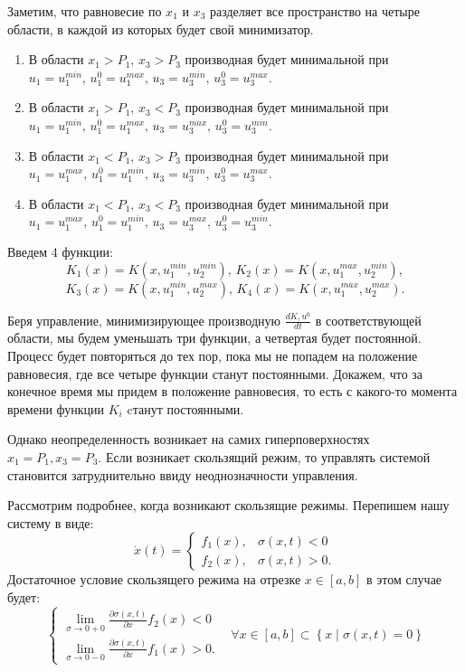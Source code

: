 \documentclass[11pt]{article}
\newcommand\Set[2]{\left\{ #1 \mid #2 \right\}}
\newcommand\dd[2]{\frac{\partial#1}{\partial#2}}
\begin{document}
Заметим, что равновесие по $x_1$ и $x_3$ разделяет все пространство на четыре области, в каждой из которых будет свой минимизатор.
\begin{enumerate}
\item
	В области $x_1 > P_1, \, x_3 > P_3$ производная будет минимальной при $u_1 = u_1^{min}, \, u_1^0 = u_1^{max}, \, u_3 = u_3^{min}, \, u_3^0 = u_3^{max}.$
\item
	В области $x_1 > P_1, \, x_3 < P_3$ производная будет минимальной при $u_1 = u_1^{min}, \, u_1^0 = u_1^{max}, \, u_3 = u_3^{max}, \, u_3^0 = u_3^{min}.$
\item
	В области $x_1 < P_1, \, x_3 > P_3$ производная будет минимальной при $u_1 = u_1^{max}, \, u_1^0 = u_1^{min}, \, u_3 = u_3^{min}, \, u_3^0 = u_3^{max}.$
\item
	В области $x_1 < P_1, \, x_3 < P_3$ производная будет минимальной при $u_1 = u_1^{max}, \, u_1^0 = u_1^{min}, \, u_3 = u_3^{max}, \, u_3^0 = u_3^{min}.$
\end{enumerate}

Введем 4 функции:
$$K_1(x) = K(x,u_1^{min}, u_2^{min}), \, K_2(x) = K(x,u_1^{max}, u_2^{min}),$$ 
$$K_3(x) = K(x,u_1^{min}, u_2^{max}), \, K_4(x) = K(x,u_1^{max}, u_2^{max}).$$

Беря управление, минимизирующее производную $\frac{dK, u^0}{dt}$ в соответствующей области, мы будем уменьшать три функции, а четвертая будет постоянной. Процесс будет повторяться до тех пор, пока мы не попадем на положение равновесия, где все четыре функции станут постоянными. Докажем, что за конечное время мы придем в положение равновесия, то есть с какого-то момента времени функции $K_i$ cтанут постоянными.


Однако неопределенность возникает на самих гиперповерхностях $x_1 = P_1, x_3 = P_3.$ Если возникает скользящий режим, то управлять системой становится затруднительно ввиду неоднозначности управления. 

Рассмотрим подробнее, когда возникают скользящие режимы. Перепишем нашу систему в виде:
$$\dot x(t) = \begin{cases} f_1(x), & \sigma(x,t) < 0 \\ f_2(x), & \sigma(x,t) > 0.\end{cases}$$
Достаточное условие скользящего режима на отрезке $x \in [a, b]$ в этом случае будет:
$$
\left\{
\begin{aligned}
    \lim_{\sigma \to 0+0}\dd{\sigma(x,t)}{x} f_2(x) < 0 \\
    \lim_{\sigma \to 0-0} \dd{\sigma(x,t)}{x} f_1(x) > 0.
\end{aligned}
\right.
\;\;\; \forall x \in [a, b] \subset \Set{x}{\sigma(x,t) = 0}
$$
\end{document}
